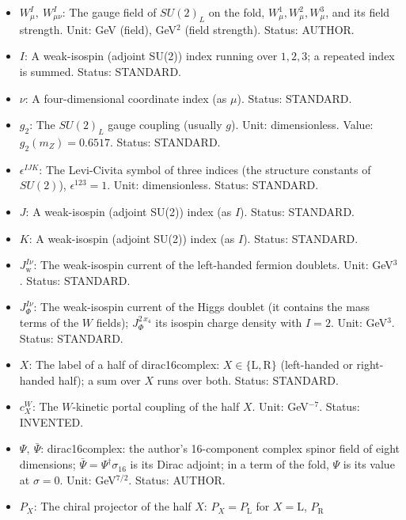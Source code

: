 \documentclass[
  10pt,
]{article}
\begin{document}
\begin{itemize}
  \(W\) and \(B\)): the gauge couplings at the fold are divided by the
  square root of the portal factor. Unit: dimensionless. Value: 1 where
  dirac16complex vanishes. Status: DERIVED.
\item
  \(W^I_\mu,\ W^I_{\mu\nu}\): The gauge field of \(SU(2)_L\) on the
  fold, \(W^1_\mu, W^2_\mu, W^3_\mu\), and its field strength. Unit: GeV
  (field), GeV\(^2\) (field strength). Status: AUTHOR.
\item
  \(I\): A weak-isospin (adjoint SU(2)) index running over \(1, 2, 3\);
  a repeated index is summed. Status: STANDARD.
\item
  \(\nu\): A four-dimensional coordinate index (as \(\mu\)). Status:
  STANDARD.
\item
  \(g_2\): The \(SU(2)_L\) gauge coupling (usually \(g\)). Unit:
  dimensionless. Value: \(g_2(m_Z) = 0.6517\). Status: STANDARD.
\item
  \(\epsilon^{IJK}\): The Levi-Civita symbol of three indices (the
  structure constants of \(SU(2)\)), \(\epsilon^{123} = 1\). Unit:
  dimensionless. Status: STANDARD.
\item
  \(J\): A weak-isospin (adjoint SU(2)) index (as \(I\)). Status:
  STANDARD.
\item
  \(K\): A weak-isospin (adjoint SU(2)) index (as \(I\)). Status:
  STANDARD.
\item
  \(J_{\mathrm{w}}^{I\nu}\): The weak-isospin current of the left-handed
  fermion doublets. Unit: GeV\(^3\). Status: STANDARD.
\item
  \(J_\Phi^{I\nu}\): The weak-isospin current of the Higgs doublet (it
  contains the mass terms of the \(W\) fields); \(J_\Phi^{2\,x_4}\) its
  isospin charge density with \(I = 2\). Unit: GeV\(^3\). Status:
  STANDARD.
\item
  \(X\): The label of a half of dirac16complex:
  \(X \in \{\mathrm{L}, \mathrm{R}\}\) (left-handed or right-handed
  half); a sum over \(X\) runs over both. Status: STANDARD.
\item
  \(c^{W}_X\): The \(W\)-kinetic portal coupling of the half \(X\).
  Unit: GeV\(^{-7}\). Status: INVENTED.
\item
  \(\Psi,\ \bar\Psi\): dirac16complex: the author's 16-component complex
  spinor field of eight dimensions;
  \(\bar\Psi = \Psi^\dagger\sigma_{16}\) is its Dirac adjoint; in a term
  of the fold, \(\Psi\) is its value at \(\sigma = 0\). Unit:
  GeV\(^{7/2}\). Status: AUTHOR.
\item
  \(P_X\): The chiral projector of the half \(X\):
  \(P_X = P_{\mathrm{L}}\) for \(X = \mathrm{L}\), \(P_{\mathrm{R}}\)

\end{itemize}
\end{document}
